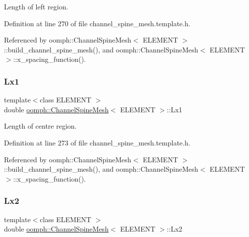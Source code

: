 Length of left region. 



Definition at line 270 of file channel\+\_\+spine\+\_\+mesh.\+template.\+h.



Referenced by oomph\+::\+Channel\+Spine\+Mesh$<$ E\+L\+E\+M\+E\+N\+T $>$\+::build\+\_\+channel\+\_\+spine\+\_\+mesh(), and oomph\+::\+Channel\+Spine\+Mesh$<$ E\+L\+E\+M\+E\+N\+T $>$\+::x\+\_\+spacing\+\_\+function().

\mbox{\label{classoomph_1_1ChannelSpineMesh_a35f5d840478b2b93199a393cbdb50f2d}} 
\subsubsection{\texorpdfstring{Lx1}{Lx1}}
{\footnotesize\ttfamily template$<$class E\+L\+E\+M\+E\+NT $>$ \\
double \hyperlink{classoomph_1_1ChannelSpineMesh}{oomph\+::\+Channel\+Spine\+Mesh}$<$ E\+L\+E\+M\+E\+NT $>$\+::Lx1\hspace{0.3cm}{\ttfamily [protected]}}



Length of centre region. 



Definition at line 273 of file channel\+\_\+spine\+\_\+mesh.\+template.\+h.



Referenced by oomph\+::\+Channel\+Spine\+Mesh$<$ E\+L\+E\+M\+E\+N\+T $>$\+::build\+\_\+channel\+\_\+spine\+\_\+mesh(), and oomph\+::\+Channel\+Spine\+Mesh$<$ E\+L\+E\+M\+E\+N\+T $>$\+::x\+\_\+spacing\+\_\+function().

\mbox{\label{classoomph_1_1ChannelSpineMesh_a4c295478a3f79335f5d0113da220844e}} 
\subsubsection{\texorpdfstring{Lx2}{Lx2}}
{\footnotesize\ttfamily template$<$class E\+L\+E\+M\+E\+NT $>$ \\
double \hyperlink{classoomph_1_1ChannelSpineMesh}{oomph\+::\+Channel\+Spine\+Mesh}$<$ E\+L\+E\+M\+E\+NT $>$\+::Lx2\hspace{0.3cm}{\ttfamily [protected]}}



